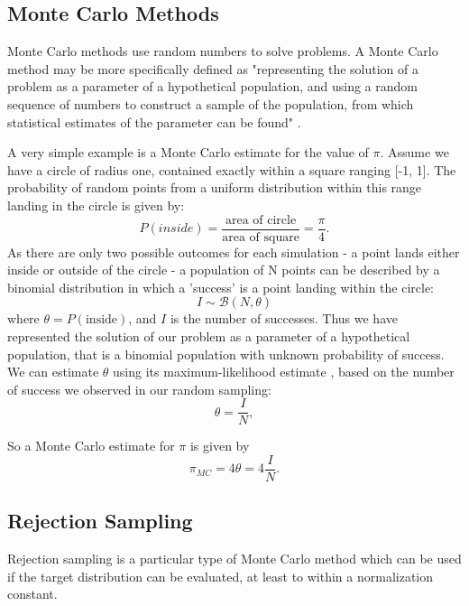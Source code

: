 \documentclass[a4paper,11pt,twoside]{article}
\begin{document}
\subsection{Monte Carlo Methods}
Monte Carlo methods use random numbers to solve problems.  A Monte Carlo method
may be more specifically defined as
"representing the solution of a problem as a parameter of a hypothetical
population, and using a random sequence of numbers to construct a sample of the
population, from which statistical estimates of the parameter can be found"
\cite{halton}.  

A very simple example is a Monte Carlo estimate for the value of $\pi$. Assume we have a
circle of radius one, contained exactly within a square ranging [-1, 1]. The
probability of random points from a uniform distribution within this range
landing in the circle is given by:
\begin{equation}
	P(inside) = \frac{\text{area of circle}}{\text{area of square}} =
	\frac{\pi}{4}.
\end{equation}
As there are only two possible outcomes for each simulation - a point lands
either inside or outside of the circle - a  population of N points can be
described by a binomial distribution in which a 'success' is a point landing within
the circle:
\begin{equation}
	I \sim \mathcal{B}(N, \theta)
\end{equation}
where $\theta = P(\text{inside})$, and $I$ is the number of successes.
Thus we have represented the solution of our problem as a parameter of a
hypothetical population, that is a binomial population with unknown probability
of success.
We can estimate $\theta$ using its maximum-likelihood estimate \cite{som}, based
on the number of success we observed in our random sampling:
\begin{equation}
	\theta = \frac{I}{N},
\end{equation}

So a Monte Carlo estimate for $\pi$ is given by
\begin{equation}
	\pi_{MC} = 4 \theta = 4 \frac{I}{N}.
\end{equation}

\subsection{Rejection Sampling}
Rejection sampling is a particular type of Monte Carlo method which can be used
if the target distribution can be evaluated, at least to within a normalization
constant. 
\end{document}
